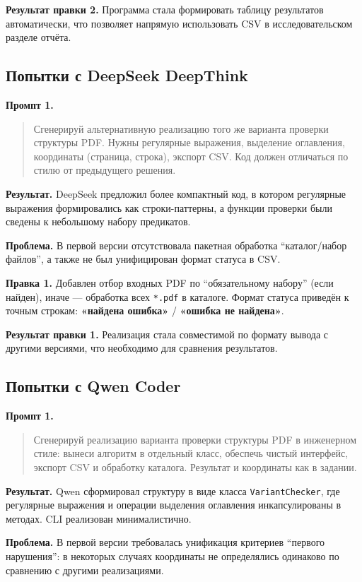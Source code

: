 \textbf{Результат правки 2.} Программа стала формировать таблицу результатов автоматически,
что позволяет напрямую использовать CSV в исследовательском разделе отчёта.

\subsection{Попытки с DeepSeek DeepThink}

\textbf{Промпт 1.}
\begin{quote}
Сгенерируй альтернативную реализацию того же варианта проверки структуры PDF.
Нужны регулярные выражения, выделение оглавления, координаты (страница, строка),
экспорт CSV. Код должен отличаться по стилю от предыдущего решения.
\end{quote}

\textbf{Результат.} DeepSeek предложил более компактный код,
в котором регулярные выражения формировались как строки-паттерны,
а функции проверки были сведены к небольшому набору предикатов.

\textbf{Проблема.} В первой версии отсутствовала пакетная обработка “каталог/набор файлов”,
а также не был унифицирован формат статуса в CSV.

\textbf{Правка 1.} Добавлен отбор входных PDF по “обязательному набору” (если найден),
иначе — обработка всех \texttt{*.pdf} в каталоге.
Формат статуса приведён к точным строкам:
\textbf{«найдена ошибка»} / \textbf{«ошибка не найдена»}.

\textbf{Результат правки 1.} Реализация стала совместимой по формату вывода с другими версиями,
что необходимо для сравнения результатов.

\subsection{Попытки с Qwen Coder}

\textbf{Промпт 1.}
\begin{quote}
Сгенерируй реализацию варианта проверки структуры PDF в инженерном стиле:
вынеси алгоритм в отдельный класс, обеспечь чистый интерфейс, экспорт CSV и обработку каталога.
Результат и координаты как в задании.
\end{quote}

\textbf{Результат.} Qwen сформировал структуру в виде класса \texttt{VariantChecker},
где регулярные выражения и операции выделения оглавления инкапсулированы в методах.
CLI реализован минималистично.

\textbf{Проблема.} В первой версии требовалась унификация критериев “первого нарушения”:
в некоторых случаях координаты не определялись одинаково по сравнению с другими реализациями.


